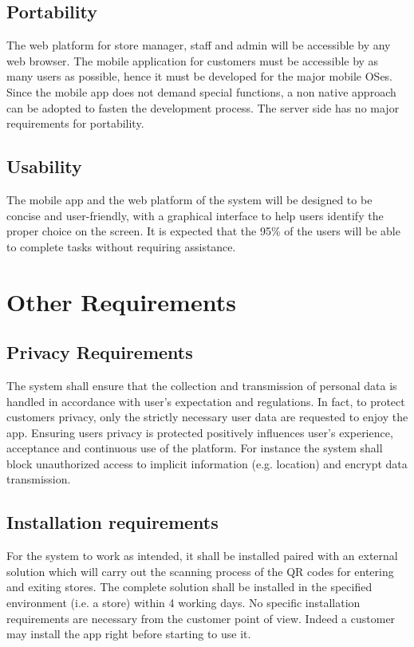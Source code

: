 \subsection{Portability}
The web platform for store manager, staff and admin will be accessible by any web browser.\newline
The mobile application for customers must be accessible by as many users as possible, hence it must be developed for the major mobile OSes. Since the mobile app does not demand special functions, a non native approach can be adopted to fasten the development process.
The server side has no major requirements for portability.

\subsection{Usability}
The mobile app and the web platform of the system will be designed to be concise and user-friendly, with a graphical interface to help users identify the proper choice on the screen. It is expected that the 95\% of the users will be able to complete tasks without requiring assistance.

\section{Other Requirements}

\subsection{Privacy Requirements}\label{req:privacy}
The system shall ensure that the collection and transmission of personal data is handled in accordance with user’s expectation and regulations.\newline
In fact, to protect customers privacy, only the strictly necessary user data are requested to enjoy the app. Ensuring users privacy is protected positively influences user’s experience, acceptance and continuous use of the platform. For instance the system shall block unauthorized access to implicit information (e.g. location) and encrypt data transmission.

\subsection{Installation requirements}
For the system to work as intended, it shall be installed paired with an external solution which will carry out the scanning process of the QR codes for entering and exiting stores.\newline
The complete solution shall be installed in the specified environment (i.e. a store) within 4 working days.\newline
No specific installation requirements are necessary from the customer point of view. Indeed a customer may install the app right before starting to use it.
